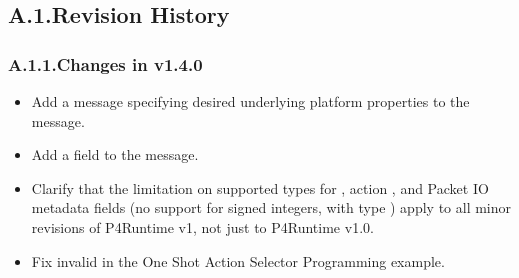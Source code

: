 \documentclass[11pt]{article}
\begin{document}
{%
\subsection{A.1.\hspace*{0.5em}Revision History}\label{sec-revision-history}%

\subsubsection{A.1.1.\hspace*{0.5em}Changes in v1.4.0}\label{sec-changes-in-v140}%

\begin{itemize}[noitemsep,topsep=\mdcompacttopsep]%

\item{}Add a  message specifying desired underlying platform
properties to the  message.%

\item{}Add a  field to the  message.%

\item{}Clarify that the limitation on supported types for , action
, and Packet IO metadata fields (no support for signed integers, with
type ) apply to all minor revisions of P4Runtime v1, not just to
P4Runtime v1.0.%

\item{}Fix invalid  in the One Shot Action Selector Programming
example.%


\end{itemize}}
\end{document}
